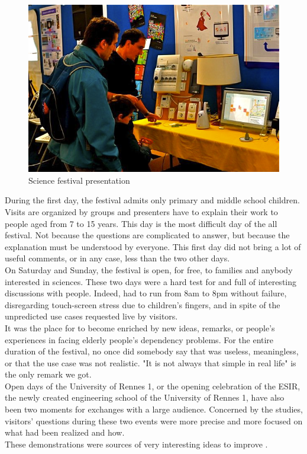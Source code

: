 \begin{figure}
\includegraphics[width=\textwidth]{part4/pics/fdls.jpg}
\caption{Science festival presentation}
\end{figure}

During the first day, the festival admits only primary and middle school children. Visits are organized by groups and presenters have to explain their work to people aged from 7 to 15 years. This day is the most difficult day of the all festival. Not because the questions are complicated to answer, but because the explanation must be understood by everyone. This first day did not bring a lot of useful comments, or in any case, less than the two other days.\\

On Saturday and Sunday, the festival is open, for free, to families and anybody interested in sciences. These two days were a hard test for \enti{} and full of interesting discussions with people. Indeed, \enti{} had to run from 8am to 8pm without failure, disregarding touch-screen stress due to children's fingers, and in spite of the unpredicted use cases requested live by visitors.\\
It was the place for \enti{} to become enriched by new ideas, remarks, or people's experiences in facing elderly people's dependency problems. For the entire duration of the festival, no once did somebody say that \enti{} was useless, meaningless, or that the use case was not realistic. "It is not always that simple in real life" is the only remark we got.\\

Open days of the University of Rennes 1, or the opening celebration of the ESIR, the newly created engineering school of the University of Rennes 1, have also been two moments for exchanges with a large audience. Concerned by the studies, visitors' questions during these two events were more precise and more focused on what had been realized and how.\\
These demonstrations were sources of very interesting ideas to improve \enti{}.\\

